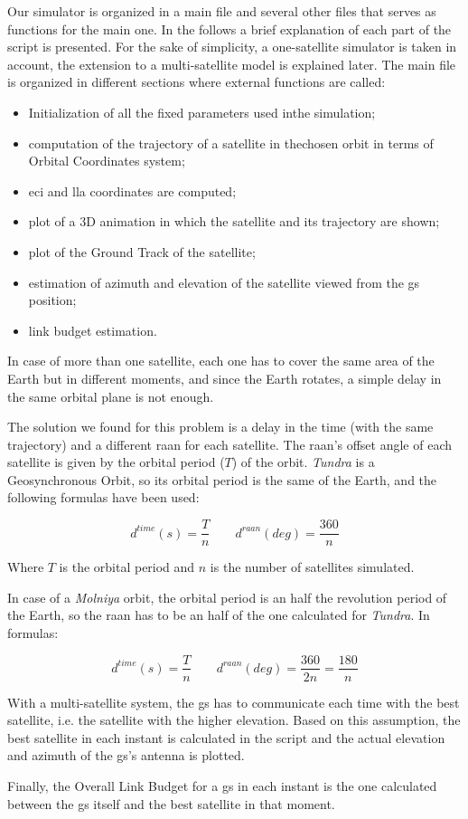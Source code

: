 Our simulator is organized in a main file and several other files that serves as functions for the main one.
In the follows a brief explanation of each part of the script is presented. For the sake of simplicity, a one-satellite simulator is taken in account, the extension to a multi-satellite model is explained later.
The main file is organized in different sections where external functions are called:
	\begin{itemize}
		\item Initialization of all the fixed parameters used inthe simulation;
		\item computation of the trajectory of a satellite in thechosen orbit in terms of Orbital Coordinates system;
		\item \gls{eci} and \gls{lla} coordinates are computed;
		\item plot of a 3D animation in which the satellite and its trajectory are shown;
		\item plot of the Ground Track of the satellite;
		\item estimation of azimuth and elevation of the satellite viewed from the \gls{gs} position;
		\item link budget estimation.
	\end{itemize}

In case of more than one satellite, each one has to cover the same area of the Earth but in different moments, and since the Earth rotates, a simple delay in the same orbital plane is not enough.

The solution we found for this problem is a delay in the time (with the same trajectory) and a different \gls{raan} for each satellite.
The \gls{raan}'s offset angle of each satellite is given by the orbital period ($T$) of the orbit.
\textit{Tundra} is a Geosynchronous Orbit, so its orbital period is the same of the Earth, and the following formulas have been used:

\begin{equation}
	d^{time}(s) = \frac{T}{n} \qquad d^{raan}(deg) = \frac{360}{n}
\end{equation}

Where $T$ is the orbital period and $n$ is the number of satellites simulated.

In case of a \textit{Molniya} orbit, the orbital period is an half the revolution period of the Earth, so the \gls{raan} has to be an half of the one calculated for \textit{Tundra}. In formulas:

\begin{equation}
	d^{time}(s) = \frac{T}{n} \qquad d^{raan}(deg) = \frac{360}{2n} = \frac{180}{n}
\end{equation}

With a multi-satellite system, the \gls{gs} has to communicate each time with the best satellite, i.e. the satellite with the higher elevation. Based on this assumption, the best satellite in each instant is calculated in the script and the actual elevation and azimuth of the \gls{gs}'s antenna is plotted.

Finally, the Overall Link Budget for a \gls{gs} in each instant is the one calculated between the \gls{gs} itself and the best satellite in that moment.
